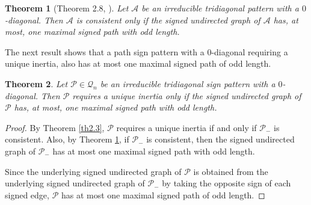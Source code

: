 \documentclass[a4paper, 10pt]{article}
\newtheorem{theorem}{Theorem}[section]
\numberwithin{equation}{section}
\begin{document}
	
	\begin{theorem} [Theorem 2.8, \cite{1}] \label{th11}
		Let $\mathcal{A}$ be an irreducible tridiagonal pattern with a $0$-diagonal. 
		Then $\mathcal{A}$ is consistent only if the signed undirected graph of $\mathcal{A}$ has, at most, one 
		maximal signed path with odd length. 
	\end{theorem}
	
	The next result shows that a path sign pattern with a $0$-diagonal requiring a unique inertia, also has at most one maximal signed path of odd length.
	
	
	
	\begin{theorem}\label{th2.51}
		Let $\mathcal{P}\in \mathcal{Q}_n$ be an irreducible tridiagonal sign pattern with a $0$-diagonal. Then $\mathcal{P}$ requires a unique inertia only if the signed undirected graph of $\mathcal{P}$ has, at most, one maximal signed path with odd length.
	\end{theorem}
	\begin{proof}
		By Theorem \ref{th2.3}, $\mathcal{P}$ requires a unique inertia if and only if $\mathcal{P}_-$ is consistent. Also, by Theorem \ref{th11}, if $\mathcal{P}_-$ is consistent, then the signed undirected graph of $\mathcal{P}_-$ has at most one maximal signed path with odd length.
		
		Since the underlying signed undirected graph of $\mathcal{P}$ is obtained from the underlying signed undirected graph of $\mathcal{P}_-$ by taking the opposite sign of each signed edge, $\mathcal{P}$ has at most one maximal signed path of odd length. %
	\end{proof}
	
	
	
\end{document}
